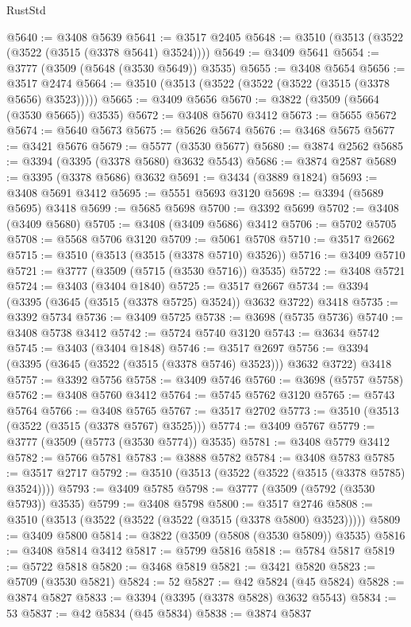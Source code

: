 \begin{lexlean}{RustStd}
\begin{coremodule}
@5640 := @3408 @5639
@5641 := @3517 @2405
@5648 := @3510 (@3513 (@3522 (@3522 (@3515 (@3378 @5641) @3524))))
@5649 := @3409 @5641
@5654 := @3777 (@3509 (@5648 (@3530 @5649)) @3535)
@5655 := @3408 @5654
@5656 := @3517 @2474
@5664 := @3510 (@3513 (@3522 (@3522 (@3522 (@3515 (@3378 @5656) @3523)))))
@5665 := @3409 @5656
@5670 := @3822 (@3509 (@5664 (@3530 @5665)) @3535)
@5672 := @3408 @5670 @3412
@5673 := @5655 @5672
@5674 := @5640 @5673
@5675 := @5626 @5674
@5676 := @3468 @5675
@5677 := @3421 @5676
@5679 := @5577 (@3530 @5677)
@5680 := @3874 @2562
@5685 := @3394 (@3395 (@3378 @5680) @3632 @5543)
@5686 := @3874 @2587
@5689 := @3395 (@3378 @5686) @3632
@5691 := @3434 (@3889 @1824)
@5693 := @3408 @5691 @3412
@5695 := @5551 @5693 @3120
@5698 := @3394 (@5689 @5695) @3418
@5699 := @5685 @5698
@5700 := @3392 @5699
@5702 := @3408 (@3409 @5680)
@5705 := @3408 (@3409 @5686) @3412
@5706 := @5702 @5705
@5708 := @5568 @5706 @3120
@5709 := @5061 @5708
@5710 := @3517 @2662
@5715 := @3510 (@3513 (@3515 (@3378 @5710) @3526))
@5716 := @3409 @5710
@5721 := @3777 (@3509 (@5715 (@3530 @5716)) @3535)
@5722 := @3408 @5721
@5724 := @3403 (@3404 @1840)
@5725 := @3517 @2667
@5734 := @3394 (@3395 (@3645 (@3515 (@3378 @5725) @3524)) @3632 @3722) @3418
@5735 := @3392 @5734
@5736 := @3409 @5725
@5738 := @3698 (@5735 @5736)
@5740 := @3408 @5738 @3412
@5742 := @5724 @5740 @3120
@5743 := @3634 @5742
@5745 := @3403 (@3404 @1848)
@5746 := @3517 @2697
@5756 := @3394 (@3395 (@3645 (@3522 (@3515 (@3378 @5746) @3523))) @3632 @3722) @3418
@5757 := @3392 @5756
@5758 := @3409 @5746
@5760 := @3698 (@5757 @5758)
@5762 := @3408 @5760 @3412
@5764 := @5745 @5762 @3120
@5765 := @5743 @5764
@5766 := @3408 @5765
@5767 := @3517 @2702
@5773 := @3510 (@3513 (@3522 (@3515 (@3378 @5767) @3525)))
@5774 := @3409 @5767
@5779 := @3777 (@3509 (@5773 (@3530 @5774)) @3535)
@5781 := @3408 @5779 @3412
@5782 := @5766 @5781
@5783 := @3888 @5782
@5784 := @3408 @5783
@5785 := @3517 @2717
@5792 := @3510 (@3513 (@3522 (@3522 (@3515 (@3378 @5785) @3524))))
@5793 := @3409 @5785
@5798 := @3777 (@3509 (@5792 (@3530 @5793)) @3535)
@5799 := @3408 @5798
@5800 := @3517 @2746
@5808 := @3510 (@3513 (@3522 (@3522 (@3522 (@3515 (@3378 @5800) @3523)))))
@5809 := @3409 @5800
@5814 := @3822 (@3509 (@5808 (@3530 @5809)) @3535)
@5816 := @3408 @5814 @3412
@5817 := @5799 @5816
@5818 := @5784 @5817
@5819 := @5722 @5818
@5820 := @3468 @5819
@5821 := @3421 @5820
@5823 := @5709 (@3530 @5821)
@5824 := 52
@5827 := @42 @5824 (@45 @5824)
@5828 := @3874 @5827
@5833 := @3394 (@3395 (@3378 @5828) @3632 @5543)
@5834 := 53
@5837 := @42 @5834 (@45 @5834)
@5838 := @3874 @5837

\end{coremodule}
\end{lexlean}
